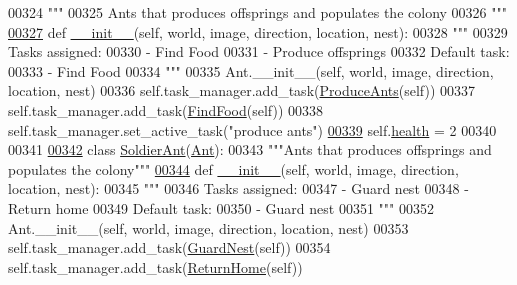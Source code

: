 \begin{DoxyCode}
00324     \textcolor{stringliteral}{"""}
00325 \textcolor{stringliteral}{    Ants that produces offsprings and populates the colony}
00326 \textcolor{stringliteral}{    """}
\hypertarget{ants_8py_source_l00327}{}\hyperlink{classants_1_1QueenAnt_aea3ff8fa90122567905806f675eb9472}{00327}     \textcolor{keyword}{def }\hyperlink{classants_1_1QueenAnt_aea3ff8fa90122567905806f675eb9472}{\_\_init\_\_}(self, world, image, direction, location, nest):
00328         \textcolor{stringliteral}{"""}
00329 \textcolor{stringliteral}{        Tasks assigned:}
00330 \textcolor{stringliteral}{            - Find Food}
00331 \textcolor{stringliteral}{            - Produce offsprings}
00332 \textcolor{stringliteral}{        Default task:}
00333 \textcolor{stringliteral}{            - Find Food}
00334 \textcolor{stringliteral}{        """}
00335         Ant.\_\_init\_\_(self, world, image, direction, location, nest)
00336         self.task\_manager.add\_task(\hyperlink{classtask__manager_1_1ProduceAnts}{ProduceAnts}(self))
00337         self.task\_manager.add\_task(\hyperlink{classtask__manager_1_1FindFood}{FindFood}(self))
00338         self.task\_manager.set\_active\_task(\textcolor{stringliteral}{"produce ants"})
\hypertarget{ants_8py_source_l00339}{}\hyperlink{classants_1_1QueenAnt_adb02e07e568bf5cf90408cb641cb5b57}{00339}         self.\hyperlink{classants_1_1Ant_aa147562276c788d4533ab63ac44d96a6}{health} = 2
00340 
00341 
\hypertarget{ants_8py_source_l00342}{}\hyperlink{classants_1_1SoldierAnt}{00342} \textcolor{keyword}{class }\hyperlink{classants_1_1SoldierAnt}{SoldierAnt}(\hyperlink{classants_1_1Ant}{Ant}):
00343     \textcolor{stringliteral}{"""Ants that produces offsprings and populates the colony"""}
\hypertarget{ants_8py_source_l00344}{}\hyperlink{classants_1_1SoldierAnt_adaaa2dc645cd3f4c190a86caa7e18f35}{00344}     \textcolor{keyword}{def }\hyperlink{classants_1_1SoldierAnt_adaaa2dc645cd3f4c190a86caa7e18f35}{\_\_init\_\_}(self, world, image, direction, location, nest):
00345         \textcolor{stringliteral}{"""}
00346 \textcolor{stringliteral}{        Tasks assigned:}
00347 \textcolor{stringliteral}{            - Guard nest}
00348 \textcolor{stringliteral}{            - Return home}
00349 \textcolor{stringliteral}{        Default task:}
00350 \textcolor{stringliteral}{            - Guard nest}
00351 \textcolor{stringliteral}{        """}
00352         Ant.\_\_init\_\_(self, world, image, direction, location, nest)
00353         self.task\_manager.add\_task(\hyperlink{classtask__manager_1_1GuardNest}{GuardNest}(self))
00354         self.task\_manager.add\_task(\hyperlink{classtask__manager_1_1ReturnHome}{ReturnHome}(self))

\end{DoxyCode}
